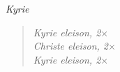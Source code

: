 \begin{center}
\itshape{Kyrie}
\end{center}

\small
\begin{verse}
\itshape{
Kyrie eleison, 2$\times$\\
Christe eleison, 2$\times$\\
Kyrie eleison, 2$\times$
}
\end{verse}
\normalsize